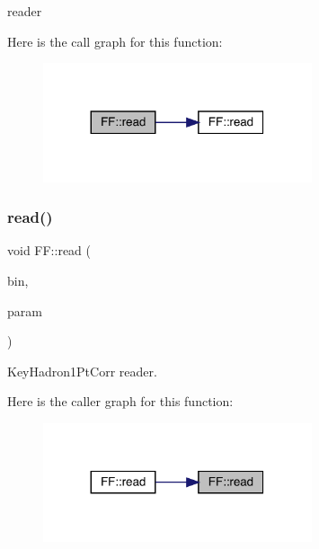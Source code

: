 reader 

Here is the call graph for this function\+:\nopagebreak
\begin{figure}[H]
\begin{center}
\leavevmode
\includegraphics[width=224pt]{d5/da6/namespaceFF_a4e59e8e764d20bb787e2992c247ca80f_cgraph}
\end{center}
\end{figure}
\mbox{\label{namespaceFF_a09293bf4dc7954334e338c256b1efc75}} 
\subsubsection{\texorpdfstring{read()}{read()}\hspace{0.1cm}{\footnotesize\ttfamily [9/14]}}
{\footnotesize\ttfamily void F\+F\+::read (\begin{DoxyParamCaption}\item[{\mbox{\hyperlink{classADATIO_1_1BinaryReader}{Binary\+Reader}} \&}]{bin,  }\item[{\mbox{\hyperlink{structFF_1_1KeyHadron1PtCorr__t}{Key\+Hadron1\+Pt\+Corr\+\_\+t}} \&}]{param }\end{DoxyParamCaption})}



Key\+Hadron1\+Pt\+Corr reader. 

Here is the caller graph for this function\+:\nopagebreak
\begin{figure}[H]
\begin{center}
\leavevmode
\includegraphics[width=224pt]{d5/da6/namespaceFF_a09293bf4dc7954334e338c256b1efc75_icgraph}
\end{center}
\end{figure}
\mbox{\label{namespaceFF_a457d1bd921b678eadc34fb2dbfcbdb32}} 

